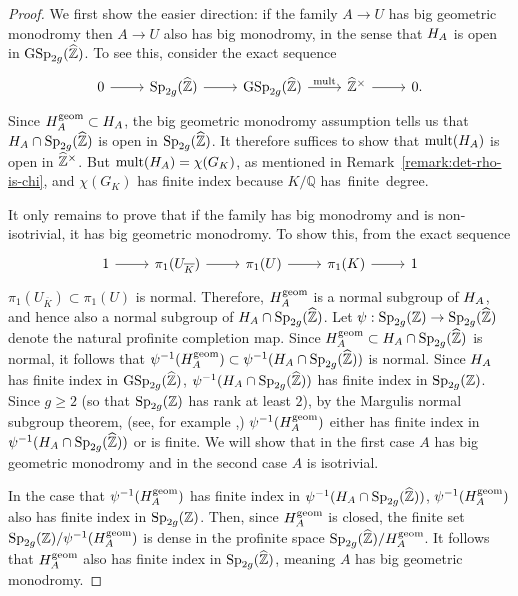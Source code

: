 \begin{proof}
We first show the easier direction: if the family $A \to U$ has big geometric 	monodromy then $A \to U$ also has big monodromy, in the sense that $H_A$ is open in $\operatorname{GSp}_{2g}(\widehat{\mathbb Z})$. To see this, consider the exact sequence
    \[
    	\begin{tikzcd}
        	0 \ar{r} & \Sp_{2g}(\zh) \ar{r} & \GSp_{2g}(\zh) \ar{r}{\on{mult}} & \zh^\times \ar{r} & 0.
        \end{tikzcd}
    \]
    Since $H_A^{\operatorname{geom}} \subset H_A$, the big geometric monodromy assumption tells us that $H_A \cap \operatorname{Sp}_{2g}(\widehat{{\mathbb Z}})$ is open in $\operatorname{Sp}_{2g}(\widehat{{\mathbb Z}})$. It therefore suffices to show that $\operatorname{mult}(H_A)$ is open in $\widehat{{\mathbb Z}}^\times$. But $\operatorname{mult}(H_A) = \chi(G_K)$, as mentioned in Remark~\ref{remark:det-rho-is-chi}, and $\chi(G_K)$ has finite index because $K/\mathbb Q$ \mbox{has finite degree.}

It only remains to prove that if the family has big monodromy
	and is non-isotrivial, it has big geometric monodromy.
	To show this, from the exact sequence
\begin{equation}
		\nonumber
		\begin{tikzcd}
			1 \ar {r} & \pi_1(U_{\overline K})  \ar {r} & \pi_1(U) \ar {r} & \pi_1(K) \ar {r} & 1
		\end{tikzcd}\end{equation}
	$\pi_1(U_{\overline K}) \subset \pi_1(U)$ is normal.
	Therefore, $H_A^{\operatorname{geom}}$ is a normal subgroup of $H_A$, and hence also a normal subgroup of $H_A \cap \operatorname{Sp}_{2g}(\widehat{{\mathbb Z}})$.
	Let $\psi: \operatorname{Sp}_{2g}({\mathbb Z}) \rightarrow \operatorname{Sp}_{2g}(\widehat{{\mathbb Z}})$ denote the natural profinite completion map.	
	Since $H_A^{\operatorname{geom}} \subset H_A \cap \operatorname{Sp}_{2g}(\widehat{{\mathbb Z}})$ is normal, 
	it follows that $\psi^{-1}(H_A^{\operatorname{geom}}) \subset \psi^{-1}(H_A \cap \operatorname{Sp}_{2g}(\widehat{{\mathbb Z}}))$ is normal.
	Since $H_A$ has finite index in $\operatorname{GSp}_{2g}(\widehat{{\mathbb Z}})$, $\psi^{-1}(H_A \cap \operatorname{Sp}_{2g}(\widehat{{\mathbb Z}}))$
	has finite index in $\operatorname{Sp}_{2g}({\mathbb Z})$. Since $g \geq 2$ (so that $\operatorname{Sp}_{2g}({\mathbb Z})$ has rank at least $2$),
	by the Margulis normal subgroup theorem, 
	(see, for example \cite[Theorem 17.1.1]{morris:introduction-to-arithmetic-groups},)
	$\psi^{-1}(H_A^{\operatorname{geom}})$ either has finite index in $\psi^{-1}(H_A \cap \operatorname{Sp}_{2g}(\widehat{{\mathbb Z}}))$
	or is finite.
	We will show that in the first case $A$ has big geometric monodromy and in the second case $A$ is isotrivial.

	In the case that $\psi^{-1}(H_A^{\operatorname{geom}})$ has finite index in $\psi^{-1}(H_A \cap \operatorname{Sp}_{2g}(\widehat{{\mathbb Z}}))$, 
$\psi^{-1}(H_A^{\operatorname{geom}})$ also has finite index in $\operatorname{Sp}_{2g}({\mathbb Z})$. 
Then, since $H_A^{\operatorname{geom}}$ is closed,
the finite set
$\operatorname{Sp}_{2g}({\mathbb Z})/\psi^{-1}(H_A^{\operatorname{geom}})$ is dense in the profinite
space $\operatorname{Sp}_{2g}(\widehat{{\mathbb Z}})/H_A^{\operatorname{geom}}$.
It follows that $H_A^{\operatorname{geom}}$ also has finite index
in $\operatorname{Sp}_{2g}(\widehat{{\mathbb Z}})$, meaning $A$ has big geometric monodromy.


\end{proof}
